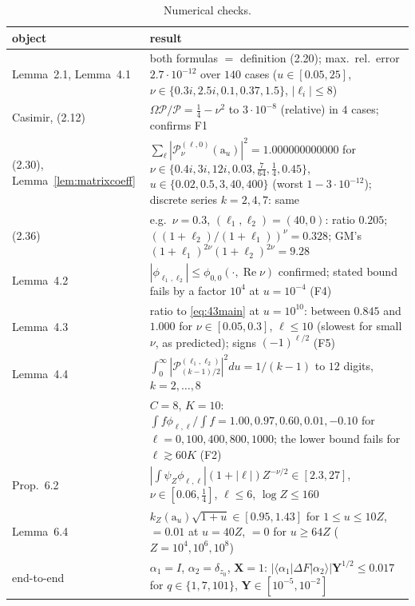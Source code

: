 \documentclass[11pt]{amsart}
\theoremstyle{remark}
\theoremstyle{definition}
\numberwithin{equation}{section}
\newcommand{\br}[1]{\langle #1\rangle}
\newcommand{\bX}{\mathbf{X}}
\newcommand{\bY}{\mathbf{Y}}
\newcommand{\Pc}{\mathcal{P}}
\newcommand{\ra}{\mathrm{a}}
\begin{document}
\begin{table}[h]
\centering
\small
\begin{tabularx}{\textwidth}{@{}lX@{}}
\toprule
object & result\\
\midrule
Lemma~2.1, Lemma~4.1 & both formulas $=$ definition (2.20); max.\ rel.\ error $2.7\cdot10^{-12}$ over $140$ cases ($u\in[0.05,25]$, $\nu\in\{0.3i,2.5i,0.1,0.37,1.5\}$, $|\ell_i|\le8$)\\
Casimir, (2.12) & $\Omega\Pc/\Pc=\frac14-\nu^2$ to $3\cdot10^{-8}$ (relative) in $4$ cases; confirms F1\\
(2.30), Lemma~\ref{lem:matrixcoeff} & $\sum_\ell|\Pc^{(\ell,0)}_\nu(\ra_u)|^2=1.000000000000$ for $\nu\in\{0.4i,3i,12i,0.03,\frac7{64},\frac14,0.45\}$, $u\in\{0.02,0.5,3,40,400\}$ (worst $1-3\cdot10^{-12}$); discrete series $k=2,4,7$: same\\
(2.36) & e.g.\ $\nu=0.3$, $(\ell_1,\ell_2)=(40,0)$: ratio $0.205$; $((1+\ell_2)/(1+\ell_1))^\nu=0.328$; GM's $(1+\ell_1)^{2\nu}(1+\ell_2)^{2\nu}=9.28$\\
Lemma~4.2 & $|\phi_{\ell_1,\ell_2}|\le\phi_{0,0}(\cdot,\operatorname{Re}\nu)$ confirmed; stated bound fails by a factor $10^4$ at $u=10^{-4}$ (F4)\\
Lemma~4.3 & ratio to \eqref{eq:43main} at $u=10^{10}$: between $0.845$ and $1.000$ for $\nu\in[0.05,0.3]$, $\ell\le10$ (slowest for small $\nu$, as predicted); signs $(-1)^{\ell/2}$ (F5)\\
Lemma~4.4 & $\int_0^\infty|\Pc^{(\ell_1,\ell_2)}_{(k-1)/2}|^2du=1/(k-1)$ to $12$ digits, $k=2,\dots,8$\\
\cite[Prop.~6.1]{GM0} & $C=8$, $K=10$: $\int f\phi_{\ell,\ell}/\int f=1.00,0.97,0.60,0.01,-0.10$ for $\ell=0,100,400,800,1000$; the lower bound fails for $\ell\gtrsim60K$ (F2)\\
Prop.~6.2 & $|\int\psi_Z\phi_{\ell,\ell}|(1+|\ell|)Z^{-\nu/2}\in[2.3,27]$, $\nu\in[0.06,\frac14]$, $\ell\le6$, $\log Z\le160$\\
Lemma~6.4 & $k_Z(\ra_u)\sqrt{1+u}\in[0.95,1.43]$ for $1\le u\le10Z$, $=0.01$ at $u=40Z$, $=0$ for $u\ge64Z$ ($Z=10^4,10^6,10^8$)\\
end-to-end & $\alpha_1=I$, $\alpha_2=\delta_{z_0}$, $\bX=1$: $|\br{\alpha_1|\Delta F|\alpha_2}|\bY^{1/2}\le0.017$ for $q\in\{1,7,101\}$, $\bY\in[10^{-5},10^{-2}]$\\
\bottomrule
\end{tabularx}
\caption{Numerical checks.}\label{tab:num}
\end{table}
\end{document}
